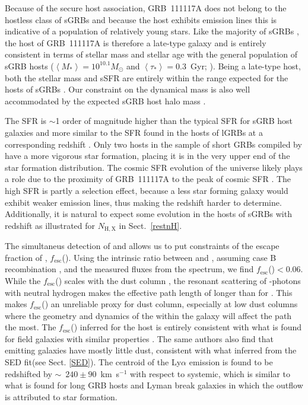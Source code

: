 \documentclass[referee]{aa}
\begin{document}
Because of the secure host association, GRB~111117A does not belong to the
hostless class of sGRBs \citep{Berger2010a} and because the host exhibits
emission lines this is indicative of a population of relatively young stars.
Like the majority of sGRBs \citep{Fong2013b}, the host of GRB~111117A is
therefore a late-type galaxy and is entirely consistent in terms of stellar mass
and stellar age with the general population of sGRB hosts ($\left\langle M _*
\right\rangle = 10^{10.1} M_{\odot}$ and $\left\langle \tau _* \right\rangle =
0.3 $~Gyr; \citealt{Leibler2010}). Being a late-type host, both the stellar mass
and sSFR are entirely within the range expected for the hosts of sGRBs
\citep{Behroozi2014}. Our constraint on the dynamical mass is also well
accommodated by the expected sGRB host halo mass \citep{Behroozi2014}.

The SFR is $\sim$1 order of magnitude higher than the typical SFR for sGRB host
galaxies \citep{Berger2014} and more similar to the SFR found in the hosts of
lGRBs at a corresponding redshift \citep{Kruhler2015}. Only two hosts in the
sample of short GRBs compiled by \citet{Berger2014} have a more vigorous star
formation, placing it is in the very upper end of the star formation
distribution. The cosmic SFR evolution of the universe likely plays a role due
to the proximity of GRB~111117A to the peak of cosmic SFR \citep{Madau2014}.
The high SFR is partly a selection effect, because a less star forming galaxy
would exhibit weaker emission lines, thus making the redshift harder to
determine. Additionally, it is natural to expect some evolution in the hosts of
sGRBs with redshift as illustrated for $N_\mathrm{H,X}$ in Sect.~\ref{restnH}.

The simultaneus detection of \lya{} and \ha{} allows us to put constraints of
the escape fraction of \lya{}, $f_{\mathrm{esc}}$(\lya). Using the intrinsic
ratio between \ha{} and \lya{}, assuming case B recombination
\citep{Brocklehurst1971}, and the measured fluxes from the spectrum, we find
$f_{\mathrm{esc}}$(\lya)$ < 0.06$. While the $f_{\mathrm{esc}}$(\lya) scales
with the dust column \citep{Hayes2011}, the resonant scattering of
\lya{}-photons with neutral hydrogen makes the effective path length of \lya{}
longer than for \ha{} \citep{Atek2009}. This makes $f_{\mathrm{esc}}$(\lya) an
unreliable proxy for dust column, especially at low dust columns
\citep{Atek2014} where the geometry and dynamics of the \hi{} within the galaxy
will affect the \lya{} path the most. The $f_{\mathrm{esc}}$(\lya) inferred for
the host is entirely consistent with what is found for field galaxies with
similar properties \citep{Oyarzun2017}. The same authors also find that \lya{}
emitting galaxies have mostly little dust, consistent with what inferred from
the SED fit(see Sect. \ref{SED}). The centroid of the Ly$\alpha$ emission is
found to be redshifted by $\sim$~$240\pm 90$~km~s$^{-1}$ with respect to
systemic, which is similar to what is found for long GRB hosts
\citep{Milvang-Jensen2012a} and Lyman break galaxies \citep{Shapley2003a} in
which the outflow is attributed to star formation.
\end{document}
